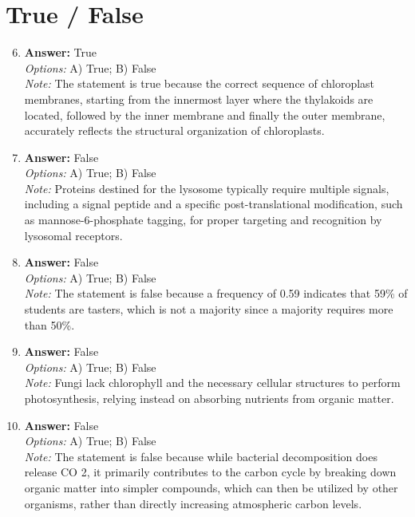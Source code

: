 \documentclass[12pt]{article}
\begin{document}
\section*{True / False}
\begin{enumerate}[label=\arabic*.]
\setcounter{enumi}{5}
\item \textbf{Answer:} True
\\ \textit{Options:} A) True; B) False
\\ \textit{Note:} The statement is true because the correct sequence of chloroplast membranes, starting from the innermost layer where the thylakoids are located, followed by the inner membrane and finally the outer membrane, accurately reflects the structural organization of chloroplasts.
\item \textbf{Answer:} False
\\ \textit{Options:} A) True; B) False
\\ \textit{Note:} Proteins destined for the lysosome typically require multiple signals, including a signal peptide and a specific post-translational modification, such as mannose-6-phosphate tagging, for proper targeting and recognition by lysosomal receptors.
\item \textbf{Answer:} False
\\ \textit{Options:} A) True; B) False
\\ \textit{Note:} The statement is false because a frequency of 0.59 indicates that 59\% of students are tasters, which is not a majority since a majority requires more than 50\%.
\item \textbf{Answer:} False
\\ \textit{Options:} A) True; B) False
\\ \textit{Note:} Fungi lack chlorophyll and the necessary cellular structures to perform photosynthesis, relying instead on absorbing nutrients from organic matter.
\item \textbf{Answer:} False
\\ \textit{Options:} A) True; B) False
\\ \textit{Note:} The statement is false because while bacterial decomposition does release CO 2, it primarily contributes to the carbon cycle by breaking down organic matter into simpler compounds, which can then be utilized by other organisms, rather than directly increasing atmospheric carbon levels.
\end{enumerate}
\end{document}
